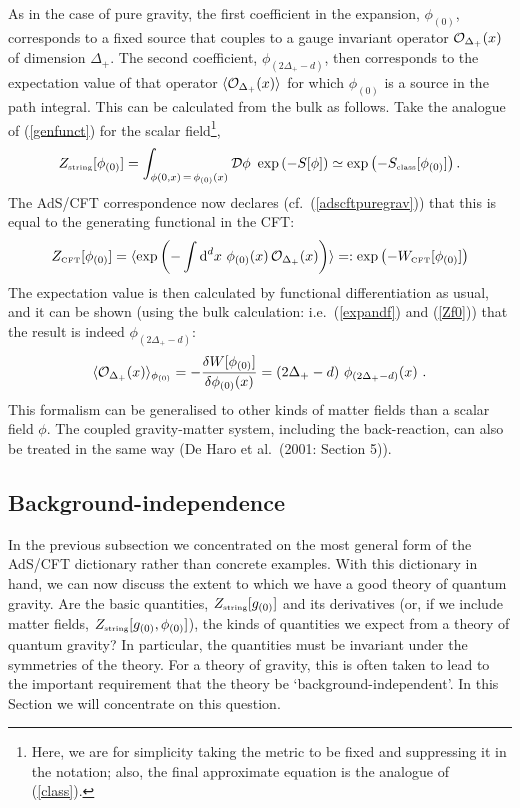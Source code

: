 \documentclass[12pt]{article}
\newcommand\bra[1]{{\langle {#1}|}}
\newcommand\ket[1]{{|{#1}\rangle}}
\def\d{\delta}
\def\dd{\mbox{d}}
\def\bra{\langle}
\def\ket{\rangle}
\def\d{\delta}
\def\D{\Delta}
\def\f{\phi}
\renewcommand{\^}[1]{\hat{#1}}
\newcommand{\tn}[1]{\mbox{\tiny #1}}
\newcommand{\bea}{\begin{eqnarray}}
\newcommand{\eea}{\end{eqnarray}}
\newcommand{\eq}[1]{(\ref{#1})}
\begin{document}
As in the case of pure gravity, the first coefficient in the expansion, $\f_{(0)}$, corresponds to a fixed source that couples to a gauge invariant operator ${\cal O}_{\D_+}(x)$ of dimension $\D_+$. The second coefficient, $\f_{(2\D_+-d)}$, then corresponds to the expectation value of that operator $\bra{\cal O}_{\D_+}(x)\ket$ for which $\f_{(0)}$ is a source in the path integral. This can be calculated from the bulk as follows. Take the analogue of \eq{genfunct} for the scalar field\footnote{Here, we are for simplicity taking the metric to be fixed and suppressing it in the notation; also, the final approximate equation is the analogue of \eq{class}.},
\bea\label{Zf0}
Z_{\tn{string}}[\f_{(0)}]=\int_{\f(0,x)\,=\,\f_{(0)}(x)}{\cal D}\f~\exp\left(-S[\f]\right)\simeq \exp\left(-S_{\tn{class}}[\f_{(0)}]\right).
\eea
The AdS/CFT correspondence now declares (cf.~\eq{adscftpuregrav}) that this is equal to the generating functional in the CFT:
\bea\label{adscft}
Z_{\tn{CFT}}[\f_{(0)}]=\bra\exp\left(-\int\dd^dx~\f_{(0)}(x)\,{\cal O}_{\D_+}(x)\right)\ket=:\exp\left(-W_{\tn{CFT}}[\f_{(0)}]\right)
\eea
The expectation value is then calculated by functional differentiation as usual, and it can be shown (using the bulk calculation: i.e.~\eq{expandf} and \eq{Zf0}) that the result is indeed $\f_{(2\D_+-d)}$:
\bea
\bra{\cal O}_{\D_+}(x)\ket_{\f_{(0)}}=-{\d W[{\f_{(0)}}]\over\d {\f_{(0)}}(x)}=(2\D_+-d)~\f_{(2\D_+-d)}(x)~.
\eea
This formalism can be generalised to other kinds of matter fields than a scalar field $\f$. The coupled gravity-matter system, including the back-reaction, can also be treated in the same way (De Haro et al.~(2001: Section 5)).

\subsection{Background-independence}\label{backindpdce}

In the previous subsection we concentrated on the most general form of the AdS/CFT dictionary rather than concrete examples. With this dictionary in hand, we can now discuss the extent to which we have a good theory of quantum gravity. Are the basic quantities, $Z_{\tn{string}}[g_{(0)}]$ and its derivatives (or, if we include matter fields, $Z_{\tn{string}}[g_{(0)},\f_{(0)}]$), the kinds of quantities we expect from a theory of quantum gravity? In particular, the quantities must be invariant under the symmetries of the theory. For a theory of gravity, this is often taken to lead to the important requirement that the theory be `background-independent'. In this Section we will concentrate on this question.
\end{document}
